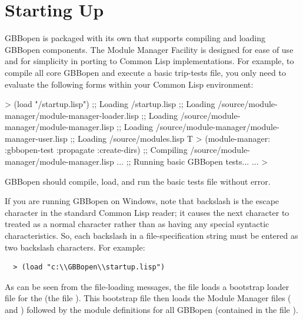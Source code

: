 \documentclass[10pt,twoside,english,pdftex]{article}
\begin{document}

\T\markright{}%
\T\pagestyle{plain}
\T\cleardoublepage
\W{}
\T\pagestyle{fancy}
\T\thispagestyle{fancybottom}
\W{}
\T\global\def\fnlastname{ }%
\section{Starting Up}
\label{sec:startup}%

GBBopen is packaged with its own  that
supports compiling and loading GBBopen components.  The Module Manager Facility
is designed for ease of use and for simplicity in porting to Common Lisp
implementations.  For example, to compile all core GBBopen  and
execute a basic trip-tests file, you only need to evaluate the following forms
within your Common Lisp environment:
%
\W\supp
\begin{example}
  > (load "/startup.lisp")
  ;; Loading /startup.lisp
  ;;  Loading /source/module-manager/module-manager-loader.lisp
  ;;   Loading /source/module-manager/module-manager.lisp
  ;;     Loading /source/module-manager/module-manager-user.lisp
  ;;  Loading /source/modules.lisp
  T
  > (module-manager: :gbbopen-test :propagate :create-dirs)
  ;; Compiling /source/module-manager/module-manager.lisp
       ...
  ;; Running basic GBBopen tests...
       ...
  >
\end{example}
%
GBBopen should compile, load, and run the basic tests file without error.

%
%
If you are running GBBopen on Windows, note that backslash is the
escape character in the standard Common Lisp reader; it causes the
next character to treated as a normal character rather than as having
any special syntactic characteristics. So, each backslash in a
file-specification string must be entered as two backslash characters.
For example:
%
\W\supp
\begin{verbatim}
  > (load "c:\\GBBopen\\startup.lisp")
\end{verbatim}
%
As can be seen from the file-loading messages, the 
file loads a bootstrap loader file for the  (the file
).  This
bootstrap file then loads the Module Manager files
( and
) followed by the
module definitions for all GBBopen  (contained in the file
).
\end{document}
